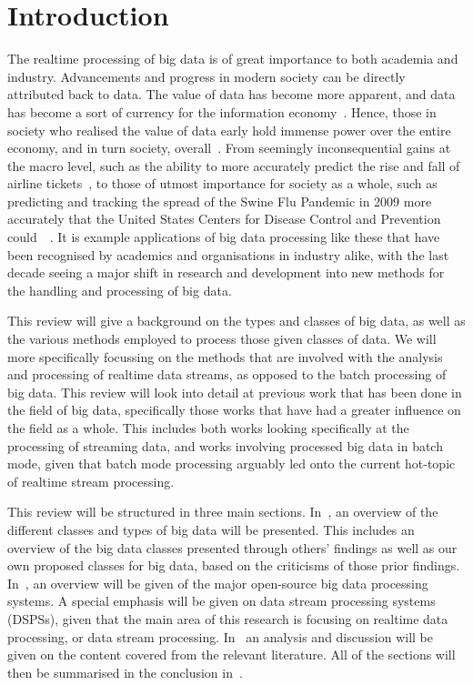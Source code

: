 \documentclass[a4paper,11pt]{article}
\begin{document}
\section{Introduction} %
\label{sec:introduction}

The realtime processing of big data is of great importance to both academia and industry. Advancements and progress in
modern society can be directly attributed back to data. The value of data has become more apparent, and data has become
a sort of currency for the information economy~\cite{st2009examining}. Hence, those in society who realised the value of
data early hold immense power over the entire economy, and in turn society, overall~\cite{lievesley1993increasing}.
From seemingly inconsequential gains at the macro level, such as the ability to more
accurately predict the rise and fall of airline tickets~\cite{darlin2006airfares}, to those of utmost importance for
society as a whole, such as predicting and tracking the spread of the Swine Flu Pandemic in 2009 more accurately that
the United States Centers for Disease Control and Prevention could~\cite{ritterman2009using}~\cite{mayer2013big}. It is
example applications of big data processing like these that have been recognised by academics and organisations in
industry alike, with the last decade seeing a major shift in research and development into new methods for the handling
and processing of big data.

This review will give a background on the types and classes of big data, as well as the various methods employed to
process those given classes of data. We will more specifically focussing on the methods that are involved with the
analysis and processing of realtime data streams, as opposed to the batch processing of big data. This review will look
into detail at previous work that has been done in the field of big data, specifically those works that have had a
greater influence on the field  as a whole. This includes both works looking specifically at the processing of streaming
data, and works involving processed big data in batch mode, given that batch mode processing arguably led onto the
current hot-topic of realtime stream processing.

This review will be structured in three main sections. In~, an overview of the different
classes and types of big data will be presented. This includes an overview of the big data classes presented through others' findings
as well as our own proposed classes for big data, based on the criticisms of those prior findings. In~,
an overview will be given of the major open-source big data processing systems. A special emphasis will be given on data stream processing
systems (DSPSs), given that the main area of this research is focusing on realtime data processing, or data stream processing.
In~ an analysis and discussion will be given on the content covered from the
relevant literature. All of the sections will then be summarised in the conclusion in~.
\end{document}
